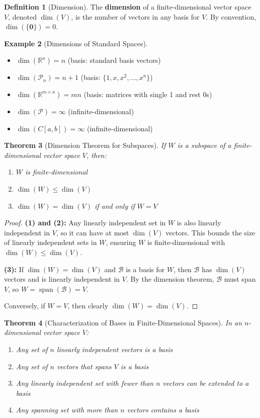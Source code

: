 \documentclass[12pt]{article}
\numberwithin{equation}{section}
\newcommand{\vect}[1]{\boldsymbol{#1}}   %
\newcommand{\Span}{\operatorname{span}}
\theoremstyle{plain}
\newtheorem{theorem}{Theorem}[section]
\theoremstyle{definition}
\newtheorem{definition}[theorem]{Definition}
\newtheorem{example}[theorem]{Example}
\theoremstyle{remark}
\begin{document}
\begin{definition}[Dimension]
The \textbf{dimension} of a finite-dimensional vector space $V$, denoted $\dim(V)$, is the number of vectors in any basis for $V$. By convention, $\dim(\{\vect{0}\}) = 0$.
\end{definition}

\begin{example}[Dimensions of Standard Spaces]
\begin{itemize}
\item $\dim(\mathbb{R}^n) = n$ (basis: standard basis vectors)
\item $\dim(\mathcal{P}_n) = n + 1$ (basis: $\{1, x, x^2, \ldots, x^n\}$)
\item $\dim(\mathbb{R}^{m \times n}) = mn$ (basis: matrices with single 1 and rest 0s)
\item $\dim(\mathcal{P}) = \infty$ (infinite-dimensional)
\item $\dim(C[a,b]) = \infty$ (infinite-dimensional)
\end{itemize}
\end{example}

\begin{theorem}[Dimension Theorem for Subspaces]
If $W$ is a subspace of a finite-dimensional vector space $V$, then:
\begin{enumerate}
\item $W$ is finite-dimensional
\item $\dim(W) \leq \dim(V)$
\item $\dim(W) = \dim(V)$ if and only if $W = V$
\end{enumerate}
\end{theorem}

\begin{proof}
\textbf{(1) and (2):} Any linearly independent set in $W$ is also linearly independent in $V$, so it can have at most $\dim(V)$ vectors. This bounds the size of linearly independent sets in $W$, ensuring $W$ is finite-dimensional with $\dim(W) \leq \dim(V)$.

\textbf{(3):} If $\dim(W) = \dim(V)$ and $\mathcal{B}$ is a basis for $W$, then $\mathcal{B}$ has $\dim(V)$ vectors and is linearly independent in $V$. By the dimension theorem, $\mathcal{B}$ must span $V$, so $W = \Span(\mathcal{B}) = V$.

Conversely, if $W = V$, then clearly $\dim(W) = \dim(V)$.
\end{proof}

\begin{theorem}[Characterization of Bases in Finite-Dimensional Spaces]
In an $n$-dimensional vector space $V$:
\begin{enumerate}
\item Any set of $n$ linearly independent vectors is a basis
\item Any set of $n$ vectors that spans $V$ is a basis
\item Any linearly independent set with fewer than $n$ vectors can be extended to a basis
\item Any spanning set with more than $n$ vectors contains a basis
\end{enumerate}
\end{theorem}
\end{document}
